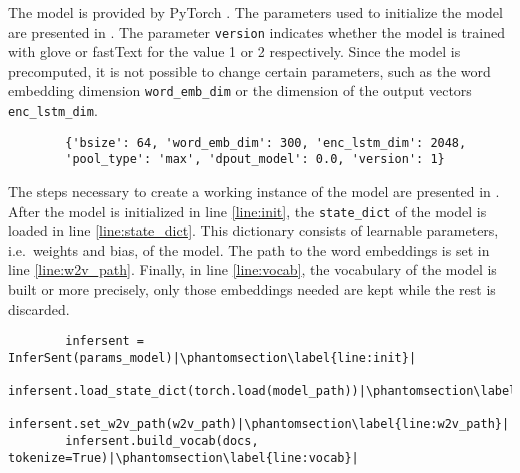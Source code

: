 \subsubsection*{\infersent{}}\label{subsubsec:impl-infersent}

The \infersent{} model is provided by PyTorch \cite{HfsentTrans2019}.
The parameters used to initialize the model are presented in .
The parameter \texttt{version} indicates whether the model is trained with \acs{glove} or fastText for the value 1 or 2 respectively.
Since the model is precomputed, it is not possible to change certain parameters, 
such as the word embedding dimension \texttt{word\_emb\_dim} or the dimension of the output vectors \texttt{enc\_lstm\_dim}.

\begin{listing}[htp]
    \begin{verbatim}
        {'bsize': 64, 'word_emb_dim': 300, 'enc_lstm_dim': 2048,  
        'pool_type': 'max', 'dpout_model': 0.0, 'version': 1}
    \end{verbatim}
    \caption{Parameters of the \infersent{} model.
    }
    \label{lst:infersent-params}
\end{listing}

The steps necessary to create a working instance of the \infersent{} model are presented in .
After the \infersent{} model is initialized in line \ref{line:init}, the \texttt{state\_dict} of the model is loaded in line \ref{line:state_dict}.
This dictionary consists of learnable parameters, i.e.\ weights and bias, of the model.
The path to the word embeddings is set in line \ref{line:w2v_path}.
Finally, in line \ref{line:vocab}, the vocabulary of the model is built or more precisely, only those embeddings needed are kept while the rest is discarded.

\begin{listing}[htp]
    \begin{verbatim}
        infersent = InferSent(params_model)|\phantomsection\label{line:init}|
        infersent.load_state_dict(torch.load(model_path))|\phantomsection\label{line:state_dict}|
        infersent.set_w2v_path(w2v_path)|\phantomsection\label{line:w2v_path}|
        infersent.build_vocab(docs, tokenize=True)|\phantomsection\label{line:vocab}|
    \end{verbatim}
    \caption{Initializing the \infersent{} model.
    }
    \label{lst:infersent-init}
\end{listing}

